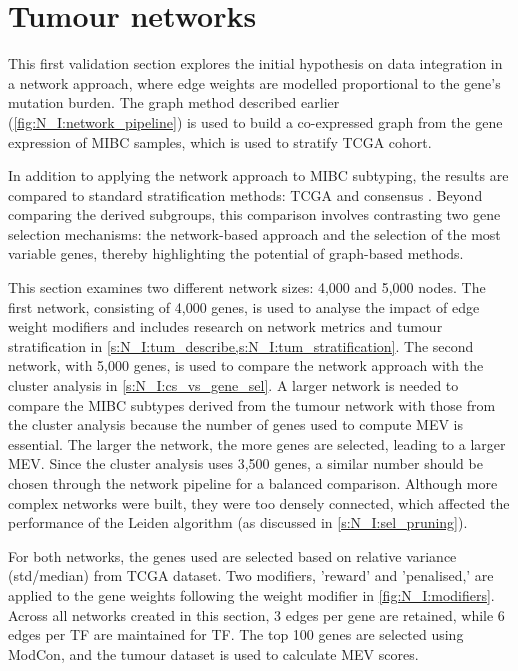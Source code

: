 \section{Tumour networks} \label{s:N_I:tum}


This first validation section explores the initial hypothesis on data integration in a network approach, where edge weights are modelled proportional to the gene's mutation burden. The graph method described earlier (\cref{fig:N_I:network_pipeline}) is used to build a co-expressed graph from the gene expression of MIBC samples, which is used to stratify TCGA cohort.

In addition to applying the network approach to MIBC subtyping, the results are compared to standard stratification methods: TCGA \citep{Robertson2017-mg} and consensus \citep{Kamoun2020-tj}. Beyond comparing the derived subgroups, this comparison involves contrasting two gene selection mechanisms: the network-based approach and the selection of the most variable genes, thereby highlighting the potential of graph-based methods.

This section examines two different network sizes: 4,000 and 5,000 nodes. The first network, consisting of 4,000 genes, is used to analyse the impact of edge weight modifiers and includes research on network metrics and tumour stratification in \cref{s:N_I:tum_describe,s:N_I:tum_stratification}. The second network, with 5,000 genes, is used to compare the network approach with the cluster analysis in \cref{s:N_I:cs_vs_gene_sel}. A larger network is needed to compare the MIBC subtypes derived from the tumour network with those from the cluster analysis because the number of genes used to compute MEV is essential. The larger the network, the more genes are selected, leading to a larger MEV. Since the cluster analysis uses 3,500 genes, a similar number should be chosen through the network pipeline for a balanced comparison. Although more complex networks were built, they were too densely connected, which affected the performance of the Leiden algorithm (as discussed in \cref{s:N_I:sel_pruning}).

For both networks, the genes used are selected based on relative variance (std/median) from TCGA dataset. Two modifiers, 'reward' and 'penalised,' are applied to the gene weights following the weight modifier in \cref{fig:N_I:modifiers}. Across all networks created in this section, 3 edges per gene are retained, while 6 edges per TF are maintained for TF. The top 100 genes are selected using ModCon, and the tumour dataset is used to calculate MEV scores.

